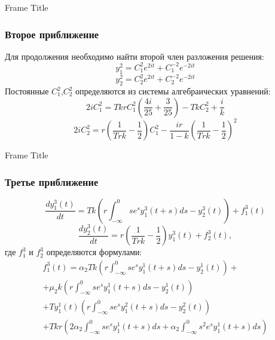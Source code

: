 \documentclass[12pt]{beamer}
\begin{document}
\begin{frame}{Frame Title}
\frametitle{Второе приближение}
    Для продолжения необходимо найти второй член разложения решения:
\begin{equation*}
     y^2_1= C_1^2 e^{2 i t}+ C_1^{-2} e^{-2 i t}
  \end{equation*}
  \begin{equation*}
     y^2_2= C_2^2 e^{2 i t}+ C_2^{-2} e^{-2 i t}
  \end{equation*}
  Постоянные $C_1^2$,$C_2^2$ определяются из системы алгебраических уравнений:
  \begin{equation*}
     2i C_1^2=T k r C_1^2( \frac{4i}{25}+\frac{3}{25})- T k C_2^2 + \frac{i}{k}
 \end{equation*}
 \begin{equation*}
     2i C_2^2=r \left(  \frac{1}{T r k} - \frac{1}{2}\right) C_1^2-\frac{i r}{1-k} \left(\frac{1}{T r k} - \frac{1}{2} \right)^2
 \end{equation*}
   \end{frame}
\begin{frame}{Frame Title}
\frametitle{Третье приближение}
     \begin{equation}\label{s3}
       \frac{d y^3_1(t)}{d t}=T k \left(r \int_{-\infty}^{0} s e^{s}y^3_1(t+s)d s -  y^3_2 (t) \right) + f^3_1 (t)
   \end{equation}
   \begin{equation*}
   \frac{d y^3_2(t)}{d t}= r\left(\frac{1}{T r k} -\frac{1}{2}\right)y^3_1(t)+f^3_2 (t) ,
\end{equation*}
где $ f^3_1 $ и $f^3_2$ определяются формулами:
\begin{multline}
    f^3_1 (t)=\alpha_2 T k \left( r \int_{-\infty}^{0} s e^{s} y^1_1 (t+s) d s - y^1_2 (t) \right)+\\+\mu_2 k \left( r \int_{-\infty}^{0} s e^{s} y^1_1 (t+s) d s - y^1_2 (t) \right)\\ +T y^1_1 (t) \left( r \int_{-\infty}^{0} s e^{s} y^2_1 (t+s) d s - y^2_2 (t) \right) \\+T k r \left(  2  \alpha_2 \int_{-\infty}^{0} s e^{s} y^1_1 (t+s)d s +  \alpha_2 \int_{-\infty}^{0}s^2 e^{s} y^1_1(t+s) d s     \right) 
    \end{multline}
\end{frame}
\end{document}

